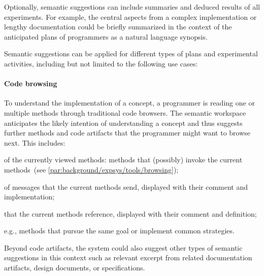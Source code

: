 Optionally, semantic suggestions can include summaries and deduced results of all experiments.
For example, the central aspects from a complex implementation or lengthy documentation could be briefly summarized in the context of the anticipated plans of programmers as a natural language synopsis.

Semantic suggestions can be applied for different types of plans and experimental activities, including but not limited to the following use cases:

	\paragraph{Code browsing}
	To understand the implementation of a concept, a programmer is reading one or multiple methods through traditional code browsers.
	The semantic workspace anticipates the likely intention of understanding a concept and thus suggests further methods and code artifacts that the programmer might want to browse next.
	This includes:

	\begin{description}[noextralabelsep]
		\item[senders] of the currently viewed methods: methods that (possibly) invoke the current methods~(see \cref{par:background/expsys/tools/browsing});
		\item[implementors] of messages that the current methods send, displayed with their comment and implementation;
		\item[classes] that the current methods reference, displayed with their comment and definition;
		\item[similar methods,] e.g., methods that pursue the same goal or implement common strategies.
	\end{description}

	Beyond code artifacts, the system could also suggest other types of semantic suggestions in this context such as relevant excerpt from related documentation artifacts, design documents, or specifications.

